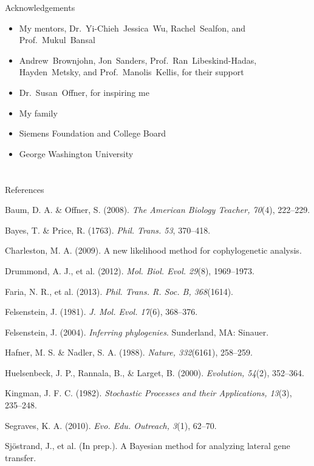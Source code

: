 \documentclass{beamer}
\let\oldsection\section
\renewcommand{\section}[1]{\oldsection{\textsc{#1}}\subsection{}}
\begin{document}
\begin{frame}{Acknowledgements}

\begin{itemize}

\item My mentors, Dr.~Yi-Chieh~Jessica~Wu, Rachel~Sealfon, and Prof.~Mukul~Bansal

\item Andrew~Brownjohn, Jon~Sanders, Prof.~Ran~Libeskind-Hadas, Hayden~Metsky, and Prof.~Manolis~Kellis, for their support

\item Dr.~Susan~Offner, for inspiring me

\item My family

\item Siemens Foundation and College Board

\item George Washington University

\end{itemize}

\end{frame}

\oldsection{}

\begin{frame}{References}
\small
\begin{hangparas}{2em}{1}
Baum, D. A. \& Offner, S. (2008). \emph{The American Biology Teacher, 70}(4), 222--229.

Bayes, T. \& Price, R. (1763). \emph{Phil. Trans. 53}, 370--418.

Charleston, M. A. (2009). A new likelihood method for cophylogenetic analysis.

Drummond, A. J., et al. (2012). \emph{Mol. Biol. Evol. 29}(8), 1969--1973.

Faria, N. R., et al. (2013). \emph{Phil. Trans. R. Soc. B, 368}(1614).

Felsenstein, J. (1981). \emph{J. Mol. Evol. 17}(6), 368--376.

Felsenstein, J. (2004). \emph{Inferring phylogenies}. Sunderland, MA: Sinauer.

Hafner, M. S. \& Nadler, S. A. (1988). \emph{Nature, 332}(6161), 258--259.

Huelsenbeck, J. P., Rannala, B., \& Larget, B. (2000). \emph{Evolution, 54}(2), 352--364.

Kingman, J. F. C. (1982). \emph{Stochastic Processes and their Applications, 13}(3), 235--248.

Segraves, K. A. (2010). \emph{Evo. Edu. Outreach, 3}(1), 62--70.

Sj\"ostrand, J., et al. (In prep.). A Bayesian method for analyzing lateral gene transfer.
\end{hangparas}
\end{frame}
\end{document}
